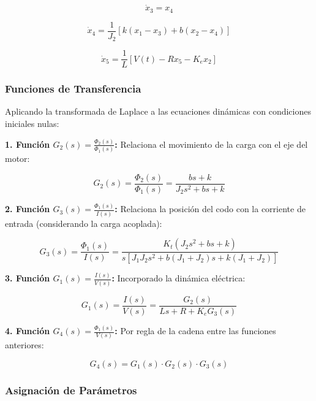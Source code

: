 \documentclass[conference]{IEEEtran}
\begin{document}
\begin{equation}
\dot{x}_3 = x_4
\end{equation}

\begin{equation}
\dot{x}_4 = \frac{1}{J_2}[k(x_1 - x_3) + b(x_2 - x_4)]
\end{equation}

\begin{equation}
\dot{x}_5 = \frac{1}{L}[V(t) - Rx_5 - K_e x_2]
\end{equation}

\subsubsection{Funciones de Transferencia}

Aplicando la transformada de Laplace a las ecuaciones dinámicas con condiciones iniciales nulas:

\textbf{1. Función $G_2(s) = \frac{\Phi_2(s)}{\Phi_1(s)}$:} Relaciona el movimiento de la carga con el eje del motor:

\begin{equation}
G_2(s) = \frac{\Phi_2(s)}{\Phi_1(s)} = \frac{bs + k}{J_2s^2 + bs + k}
\end{equation}

\textbf{2. Función $G_3(s) = \frac{\Phi_1(s)}{I(s)}$:} Relaciona la posición del codo con la corriente de entrada (considerando la carga acoplada):

\begin{equation}
G_3(s) = \frac{\Phi_1(s)}{I(s)} = \frac{K_t(J_2s^2 + bs + k)}{s[J_1J_2s^2 + b(J_1 + J_2)s + k(J_1 + J_2)]}
\end{equation}

\textbf{3. Función $G_1(s) = \frac{I(s)}{V(s)}$:} Incorporado la dinámica eléctrica:

\begin{equation}
G_1(s) = \frac{I(s)}{V(s)} = \frac{G_2(s)}{Ls + R + K_e G_3(s)}
\end{equation}

\textbf{4. Función $G_4(s) = \frac{\Phi_1(s)}{V(s)}$:} Por regla de la cadena entre las funciones anteriores:

\begin{equation}
G_4(s) = G_1(s) \cdot G_2(s) \cdot G_3(s)
\end{equation}

\subsubsection{Asignación de Parámetros}
\end{document}
